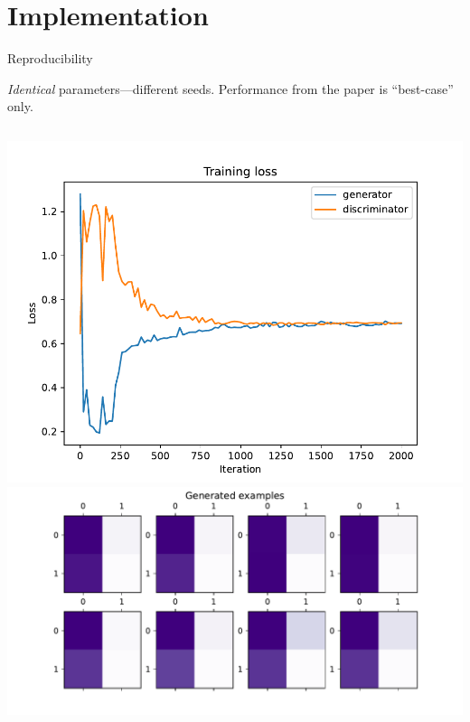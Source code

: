 \documentclass{beamer}
\begin{document}
\section{Implementation}
\begin{frame}{Reproducibility}

\emph{Identical} parameters---different seeds.  Performance from the paper is ``best-case'' only.

\begin{columns}
\centering
    \includegraphics[width=\linewidth]{figures/training_loss_1.pdf}
    \includegraphics[width=\linewidth]{figures/examples_1.pdf}


\end{columns}
\end{frame}
\end{document}
